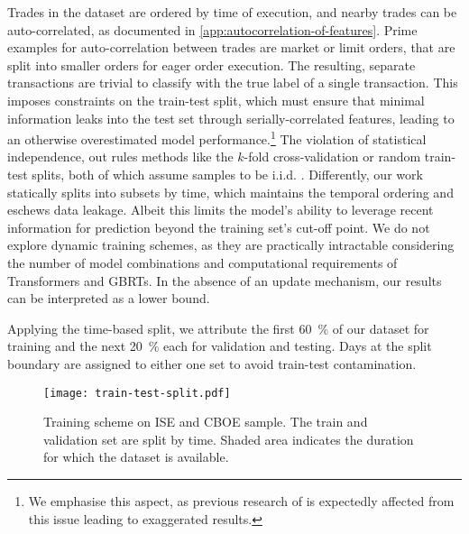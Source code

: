 Trades in the dataset are ordered by time of execution, and nearby trades can be auto-correlated, as documented in \cref{app:autocorrelation-of-features}.
Prime examples for auto-correlation between trades are market or limit orders, that are split into smaller orders for eager order execution. %
The resulting, separate transactions are trivial to classify with the true label of a single transaction. This imposes constraints on the train-test split, which must ensure that minimal information leaks into the test set through serially-correlated features, leading to an otherwise overestimated model performance.\footnote{We emphasise this aspect, as previous research of \textcite[][14]{ronenMachineLearningTrade2022} is expectedly affected from this issue leading to exaggerated results.} The violation of statistical independence, out rules methods like the $k$-fold cross-validation or random train-test splits, both of which assume samples to be i.i.d. \autocite[][103--105]{lopezdepradoAdvancesFinancialMachine2018}. Differently, our work statically splits into subsets by time, which maintains the temporal ordering and eschews data leakage. Albeit this limits the model's ability to leverage recent information for prediction beyond the training set's cut-off point. We do not explore dynamic training schemes, as they are practically intractable considering the number of model combinations and computational requirements of Transformers and \glspl{GBRT}. In the absence of an update mechanism, our results can be interpreted as a lower bound.

Applying the time-based split, we attribute the first \SI{60}{\percent} of our dataset for training and the next \SI{20}{\percent} each for validation and testing. Days at the split boundary are assigned to either one set to avoid train-test contamination. %

\begin{figure}[ht]
    \centering
    \texttt{[image: train-test-split.pdf]}
    \caption[Training Scheme on  and  Sample]{Training scheme on \gls{ISE} and \gls{CBOE} sample. The train and validation set are split by time. Shaded area  indicates the duration for which the dataset is available.}
    \label{fig:train-test-split}
\end{figure}

